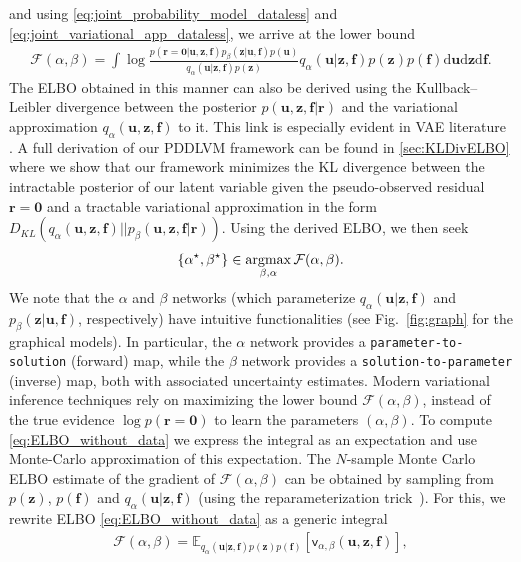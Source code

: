 \documentclass[11pt, fleqn]{article}
\def\cF{{\mathcal F}}
\newcommand{\argmax}{\operatornamewithlimits{argmax}}
\def\z{{\mathbf z}}
\def\fbf{{\mathbf f}}
\def\ubf{{\mathbf u}}
\def\r{{\mathbf r}}
\def\cF{{\mathcal F}}
\def\bE{{\mathbb E}}
\def\md{{\mathrm d}}
\begin{document}
and using \eqref{eq:joint_probability_model_dataless} and \eqref{eq:joint_variational_app_dataless}, we arrive at the lower bound
\begin{align}\label{eq:ELBO_without_data}
        \cF(\alpha,\beta) = \int \log \frac{p(\r = \mathbf{0}|\ubf, \z, \fbf) p_{\beta}(\z | \ubf, \fbf) p(\ubf)}{q_{\alpha}(\ubf | \z, \fbf) p(\z)}q_{\alpha}(\ubf | \z, \fbf) p(\z)p(\fbf) \md \ubf \md \z  \md \fbf.
\end{align}
The \gls*{ELBO} obtained in this manner can also be derived using the Kullback–Leibler divergence between the posterior $p(\ubf, \z, \fbf|\r)$ and the variational approximation $q_\alpha(\ubf, \z, \fbf)$ to it. This link is especially evident in VAE literature \cite{kingma2019introduction}. A full derivation of our \gls*{PDDLVM} framework can be found in \ref{sec:KLDivELBO} where we show that our framework minimizes the KL divergence between the intractable posterior of our latent variable given the pseudo-observed residual $\r = \mathbf{0}$  and a tractable variational approximation in the form $D_{KL}( q_\alpha(\ubf, \z, \fbf)||p_\beta(\ubf,\z,\fbf|\r))$.
Using the derived \gls*{ELBO}, we then seek 
\begin{equation}
    \{\alpha^{\star}, \beta^{\star}\} \in \argmax_{\beta,  \alpha} \cF(\alpha, \beta).
\end{equation}
We note that the $\alpha$ and $\beta$ networks (which parameterize $q_\alpha(\ubf | \z, \fbf)$ and $p_\beta(\z | \ubf, \fbf)$, respectively) have intuitive functionalities (see Fig.~\ref{fig:graph} for the graphical models). In particular, the $\alpha$ network provides a \texttt{parameter-to-solution} (forward) map, while the $\beta$ network provides a \texttt{solution-to-parameter} (inverse) map, both with associated uncertainty estimates.
Modern variational inference techniques rely on maximizing the lower bound $\cF(\alpha, \beta)$, instead of the true evidence $\log p(\r = \mathbf{0})$ to learn the parameters $(\alpha, \beta)$. To compute \eqref{eq:ELBO_without_data} we express the integral as an expectation and use Monte-Carlo approximation of this expectation. The $N$-sample Monte Carlo \gls*{ELBO} estimate of the gradient of $\cF(\alpha, \beta)$ can be obtained by sampling from $p(\z)$, $p(\fbf)$ and $q_\alpha(\ubf | \z, \fbf)$ (using the reparameterization trick~\cite{kingma2013auto}). For this, we rewrite \gls*{ELBO} \eqref{eq:ELBO_without_data} as a generic integral
\begin{align}
    \cF(\alpha, \beta) = \bE_{q_\alpha(\ubf | \z, \fbf) p(\z) p(\fbf)}[\mathsf{v}_{\alpha,\beta}(\ubf, \z, \fbf)],
\end{align}
\end{document}
